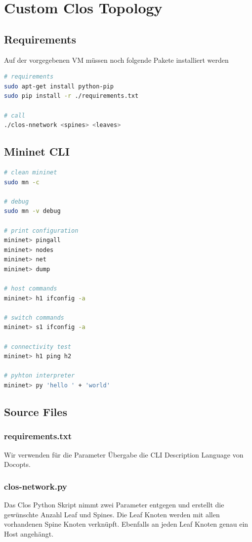 

\newcommand{\SUBJECT}{Report}
\newcommand{\TITLE}{Cloud Infrastructre Lab 7}



\section{Custom Clos Topology}
\subsection{Requirements}
Auf der vorgegebenen VM müssen noch folgende Pakete installiert werden
\begin{lstlisting}[language=bash]
# requirements
sudo apt-get install python-pip
sudo pip install -r ./requirements.txt

# call
./clos-nnetwork <spines> <leaves>
\end{lstlisting}

\subsection{Mininet CLI}
\begin{lstlisting}[language=bash]
# clean mininet
sudo mn -c

# debug
sudo mn -v debug

# print configuration
mininet> pingall
mininet> nodes
mininet> net
mininet> dump

# host commands
mininet> h1 ifconfig -a

# switch commands
mininet> s1 ifconfig -a

# connectivity test
mininet> h1 ping h2

# pyhton interpreter
mininet> py 'hello ' + 'world'
\end{lstlisting}

\subsection{Source Files}
\subsubsection{requirements.txt}
Wir verwenden für die Parameter Übergabe die CLI Description Language von Docopts. 


\subsubsection{clos-network.py}
Das Clos Python Skript nimmt zwei Parameter entgegen und erstellt die gewünschte Anzahl Leaf und Spines. Die Leaf Knoten werden mit allen vorhandenen Spine Knoten verknüpft. Ebenfalls an jeden Leaf Knoten genau ein Host angehängt.


